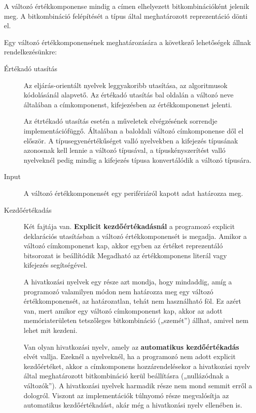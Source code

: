 A változó értékkomponense mindig a címen elhelyezett bitkombinációként jelenik meg. A bitkombináció felépítését a típus által meghatározott reprezentáció dönti el.

Egy változó értékkomponensének meghatározására a következő lehetőségek állnak rendelkezésünkre:
\begin{description}
	\item[Értékadó utasítás] Az eljárás-orientált nyelvek leggyakoribb utasítása, az algoritmusok kódolásánál alapvető. Az értékadó utasítás bal oldalán a változó neve általában a címkomponenst, kifejezésben az értékkomponenst jelenti. 
	
	Az étrtékadó utasítás esetén a műveletek elvégzésének sorrendje implementációfüggő. Általában a baloldali változó címkomponense dől el először. A típusegyenértékűséget valló nyelvekben a kifejezés típusának azonosnak kell lennie a változó típusával, a típuskényszerítést valló nyelveknél pedig mindig a kifejezés típusa konvertálódik a változó típusára.
	\item[Input] A változó értékkomponensét egy perifériáról kapott adat határozza meg.
	\item[Kezdőértékadás] Két fajtája van. \textbf{Explicit kezdőértékadásnál} a programozó explicit deklarációs utasításban a változó értékkomponensét is megadja. Amikor a változó címkomponenst kap, akkor egyben az értéket reprezentáló bitsorozat is beállítódik Megadható az értékkomponens literál vagy kifejezés segítségével.
	
	A hivatkozási nyelvek egy része azt mondja, hogy mindaddig, amíg a programozó valamilyen módon nem határozza meg egy változó értékkomponensét, az határozatlan, tehát nem használható föl. Ez azért van, mert amikor egy változó címkomponenst kap, akkor az adott memóriaterületen tetszőleges bitkombináció („szemét”) állhat, amivel nem lehet mit kezdeni.
	
	Van olyan hivatkozási nyelv, amely az \textbf{automatikus kezdőértékadás} elvét vallja. Ezeknél a nyelveknél, ha a programozó nem adott explicit kezdőértéket, akkor a címkomponens hozzárendelésekor a hivatkozási nyelv által meghatározott bitkombináció kerül beállításra („nullázódnak a változók”). A hivatkozási nyelvek harmadik része nem mond semmit erről a dologról. Viszont az implementációk túlnyomó része megvalósítja az automatikus kezdőértékadást, akár még a hivatkozási nyelv ellenében is.
\end{description}

